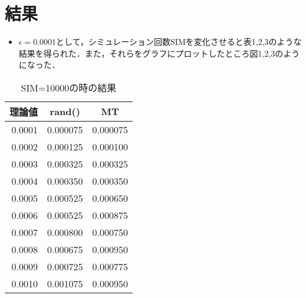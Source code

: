 \documentclass[12pt]{jarticle}
\begin{document}
\section{結果}
\begin{itemize}
    \item $\epsilon=0.0001$として，シミュレーション回数SIMを変化させると表1,2,3のような結果を得られた．また，それらをグラフにプロットしたところ図1,2,3のようになった．
\end{itemize}
\begin{table}[h]
    \begin{minipage}{0.5\hsize}
        \begin{center}
            \caption{SIM=10000の時の結果}
            \begin{tabular}{|r|r|r|} \hline
                \multicolumn{1}{|c|}{理論値} & \multicolumn{1}{|c|}{rand()} & \multicolumn{1}{|c|}{MT} \\\hline
                0.0001                       & 0.000075                     & 0.000075                 \\\hline
                0.0002                       & 0.000125                     & 0.000100                 \\\hline
                0.0003                       & 0.000325                     & 0.000325                 \\\hline
                0.0004                       & 0.000350                     & 0.000350                 \\\hline
                0.0005                       & 0.000525                     & 0.000650                 \\\hline
                0.0006                       & 0.000525                     & 0.000875                 \\\hline
                0.0007                       & 0.000800                     & 0.000750                 \\\hline
                0.0008                       & 0.000675                     & 0.000950                 \\\hline
                0.0009                       & 0.000725                     & 0.000775                 \\\hline
                0.0010                       & 0.001075                     & 0.000950                 \\\hline
            \end{tabular}
        \end{center}

\end{minipage}
\end{table}
\end{document}
